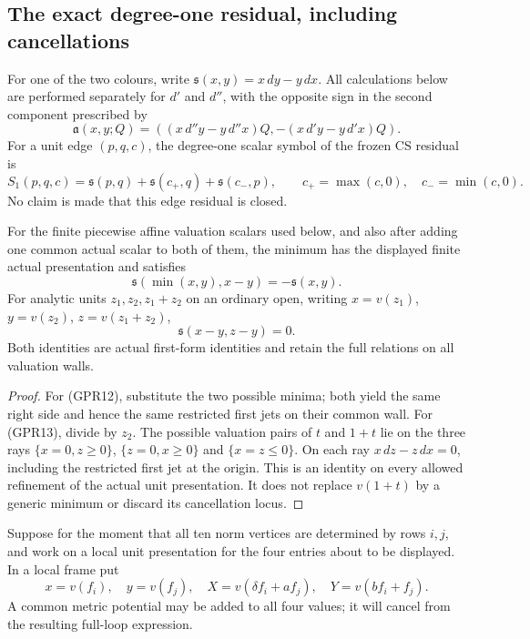 \subsection{The exact degree-one residual, including cancellations}

For one of the two colours, write
$\mathfrak s(x,y)=x\,dy-y\,dx$.  All calculations below are
performed separately for $d'$ and $d''$, with the opposite sign
in the second component prescribed by
\[
 \mathfrak a(x,y;Q)=
 ((x\,d''y-y\,d''x)Q,-(x\,d'y-y\,d'x)Q).
 \tag{GPR10}
\]
For a unit edge $(p,q,c)$, the degree-one scalar symbol of the
frozen CS residual is
\[
 S_1(p,q,c)=\mathfrak s(p,q)
       +\mathfrak s(c_+,q)+\mathfrak s(c_-,p),
 \qquad c_+=\max(c,0),\quad c_-=\min(c,0).
 \tag{GPR11}
\]
No claim is made that this edge residual is closed.

\begin{lemma}
For the finite piecewise affine valuation scalars used below, and
also after adding one common actual scalar to both of them, the
minimum has the displayed finite actual presentation and satisfies
\[
 \mathfrak s(\min(x,y),x-y)=-\mathfrak s(x,y).
 \tag{GPR12}
\]
For analytic units $z_1,z_2,z_1+z_2$ on an ordinary open,
writing $x=v(z_1)$, $y=v(z_2)$, $z=v(z_1+z_2)$,
\[
                         \mathfrak s(x-y,z-y)=0.
 \tag{GPR13}
\]
Both identities are actual first-form identities and retain the
full relations on all valuation walls.
\end{lemma}

\begin{proof}
For (GPR12), substitute the two possible minima; both yield the
same right side and hence the same restricted first jets on their
common wall.  For (GPR13), divide by $z_2$.  The possible
valuation pairs of $t$ and $1+t$ lie on the three rays
$\{x=0,z\ge0\}$, $\{z=0,x\ge0\}$ and
$\{x=z\le0\}$.  On each ray $x\,dz-z\,dx=0$, including
the restricted first jet at the origin.  This is an identity on
every allowed refinement of the actual unit presentation.  It
does not replace $v(1+t)$ by a generic minimum or discard its
cancellation locus.
\end{proof}

Suppose for the moment that all ten norm vertices are determined
by rows $i,j$, and work on a local unit presentation for the four
entries about to be displayed.  In a local frame put
\[
 x=v(f_i),\quad y=v(f_j),\quad
 X=v(\delta f_i+a f_j),\quad Y=v(bf_i+f_j).
 \tag{GPR14}
\]
A common metric potential may be added to all four values; it
will cancel from the resulting full-loop expression.

